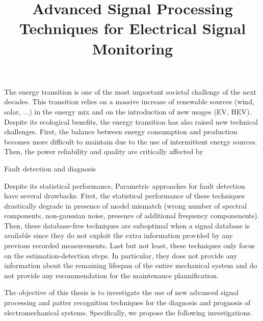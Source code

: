 \documentclass{article}
\begin{document}
\title{Advanced Signal Processing Techniques for Electrical Signal Monitoring}
   
 \maketitle  
 
The energy transition is one of the most important societal challenge of the next decades. This transition relies on a massive increase of renewable sources (wind, solar, ...) in the energy mix and on the introduction of new usages (EV, HEV). Despite its ecological benefits, the energy transition has also raised new technical challenges. First, the balance between energy consumption and production becomes more difficult to maintain due to the use of intermittent energy sources. Then, the power reliability and quality are critically affected by 


Fault detection and diagnosis

Despite its statistical performance, Parametric approaches for fault detection have several drawbacks. First, the statistical performance of these techniques drastically degrade in presence of model mismatch (wrong number of spectral components, non-gaussian noise, presence of additional frequency componenents). Then, these database-free techniques are suboptimal when a signal database is available since they do not exploit the extra information provided by any previous recorded measurements.
Last but not least, these techniques only focus on the estimation-detection steps. In particular, they does not provide any information about the remaining lifespan of the entire mechanical system and do not provide any recommendation for the maintenance plannification.

The objective of this thesis is to investigate the use of new advanced signal processing and patter recognition techniques for the diagnosis and prognosis of electromechanical systems. Specifically, we propose the following investigations.
\end{document}
